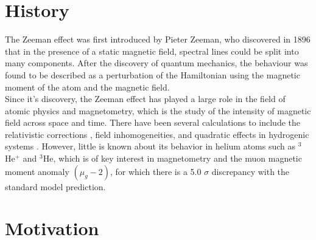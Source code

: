     \section{History}\label{sec:history}
        The Zeeman effect was first introduced by Pieter Zeeman, who discovered in 1896 that in the presence of a static magnetic field, spectral lines could be split into many components. After the discovery of quantum mechanics, the behaviour was found to be described as a perturbation of the Hamiltonian using the magnetic moment of the atom and the magnetic field.   \\
    
        Since it's discovery, the Zeeman effect has played a large role in the field of atomic physics and magnetometry, which is the study of the intensity of magnetic field across space and time. There have been several calculations to include the relativistic corrections \cite{2007Drake-Wu, Drake-Yan}, field inhomogeneities, and quadratic effects in hydrogenic systems \cite{Fontanari_Sadovskií_2015}. However, little is known about its behavior in helium atoms such as $^3$He$^+$ and $^3$He, which is of key interest in magnetometry and the muon magnetic moment anomaly $(\mu_g - 2)$, for which there is a 5.0 $\sigma$ discrepancy \cite{aguillard2023measurement} with the standard model prediction.

    \section{Motivation}\label{sec:motivation}

